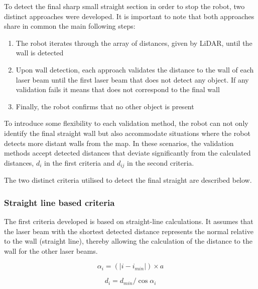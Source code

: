\documentclass[conference]{IEEEtran}
\begin{document}
To detect the final sharp small straight section in order to stop the robot, two distinct approaches were developed. It is important to note that both approaches share in common the main following steps:

\begin{enumerate}
    \item The robot iterates through the array of distances, given by LiDAR, until the wall is detected
    \item Upon wall detection, each approach validates the distance to the wall of each laser beam until the first laser beam that does not detect any object. If any validation fails it means that does not correspond to the final wall
    \item Finally, the robot confirms that no other object is present
\end{enumerate}

To introduce some flexibility to each validation method, the robot can not only identify the final straight wall but also accommodate situations where the robot detects more distant walls from the map. In these scenarios, the validation methods accept detected distances that deviate significantly from the calculated distances, $d_i$ in the first criteria and $d_{ij}$ in the second criteria.

The two distinct criteria utilised to detect the final straight are described below.

\subsubsection{Straight line based criteria}

The first criteria developed is based on straight-line calculations. It assumes that the laser beam with the shortest detected distance represents the normal relative to the wall (straight line), thereby allowing the calculation of the distance to the wall for the other laser beams.

\begin{equation} \label{eq:straight_line1}
    \alpha_i = (|i - i_{min}|) \times a
\end{equation}

\begin{equation} \label{eq:straight_line2}
    d_i = d_{min} / \cos{\alpha_i}
\end{equation}
\end{document}
